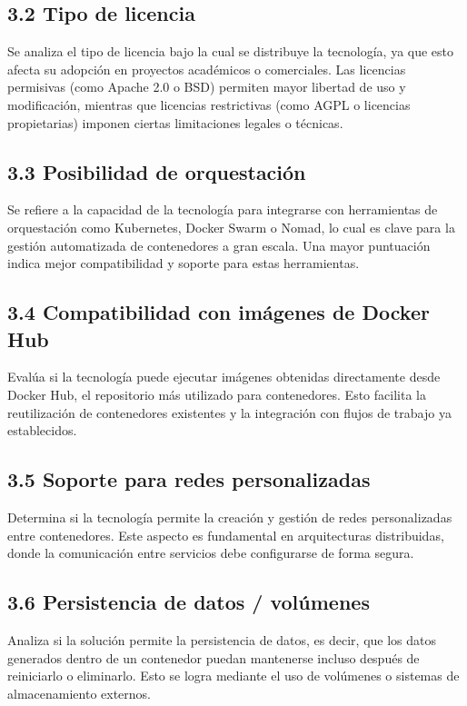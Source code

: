\subsection*{3.2 Tipo de licencia}
Se analiza el tipo de licencia bajo la cual se distribuye la tecnología, ya que esto afecta su adopción en proyectos académicos o comerciales. Las licencias permisivas (como Apache 2.0 o BSD) permiten mayor libertad de uso y modificación, mientras que licencias restrictivas (como AGPL o licencias propietarias) imponen ciertas limitaciones legales o técnicas.

\subsection*{3.3 Posibilidad de orquestación}
Se refiere a la capacidad de la tecnología para integrarse con herramientas de orquestación como Kubernetes, Docker Swarm o Nomad, lo cual es clave para la gestión automatizada de contenedores a gran escala. Una mayor puntuación indica mejor compatibilidad y soporte para estas herramientas.

\subsection*{3.4 Compatibilidad con imágenes de Docker Hub}
Evalúa si la tecnología puede ejecutar imágenes obtenidas directamente desde Docker Hub, el repositorio más utilizado para contenedores. Esto facilita la reutilización de contenedores existentes y la integración con flujos de trabajo ya establecidos.

\subsection*{3.5 Soporte para redes personalizadas}
Determina si la tecnología permite la creación y gestión de redes personalizadas entre contenedores. Este aspecto es fundamental en arquitecturas distribuidas, donde la comunicación entre servicios debe configurarse de forma segura.

\subsection*{3.6 Persistencia de datos / volúmenes}
Analiza si la solución permite la persistencia de datos, es decir, que los datos generados dentro de un contenedor puedan mantenerse incluso después de reiniciarlo o eliminarlo. Esto se logra mediante el uso de volúmenes o sistemas de almacenamiento externos.

